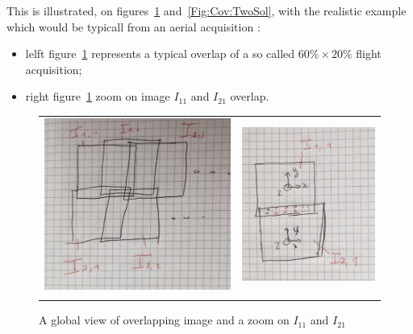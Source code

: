 This is illustrated, on figures~\ref{Fig:Cov:Overlap} and~\ref{Fig:Cov:TwoSol}, 
with the realistic example which would be typicall from 
an aerial acquisition  :

\begin{itemize}
    \item  lelft figure~\ref{Fig:Cov:Overlap} represents a typical overlap of
          a so called $60\% \times 20\%$ flight acquisition;
    \item  right figure~\ref{Fig:Cov:Overlap} zoom on image $I_{11}$ and $I_{21}$
          overlap.
\end{itemize}



\begin{figure}
\begin{center}
\begin{tabular}{||c|c||}
   \hline \hline
\includegraphics[width=70mm]{FIGS/Cov/Global.jpeg} &
\includegraphics[width=50mm]{FIGS/Cov/TwoIm.jpeg} \\
  \\ \hline  \hline
\end{tabular}
\label{Fig:Cov:Overlap}
\caption{A global view of overlapping image and a zoom on $I_{11}$ and $I_21$}
\end{center}
\end{figure}


